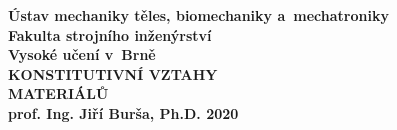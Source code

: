 \documentclass[a4paper, 12pt, oneside]{report}
\numberwithin{equation}{part}
\begin{document}
\begin{titlepage}
\pagecolor{fsimodra}
\color{white}
\renewcommand{\thepage}{cover}
\centering
\bfseries
{Ústav mechaniky těles, biomechaniky a~mechatroniky\\Fakulta strojního inženýrství\\Vysoké učení v~Brně\\}
\vfill
{\Huge KONSTITUTIVNÍ VZTAHY\\MATERIÁLŮ\\}
\vfill
{\LARGE prof. Ing. Jiří Burša, Ph.D.}
\vfill
2020
\end{titlepage}

\clearpage
\nopagecolor
\color{black}
\clearpage
{}





\appendix

\end{document}
